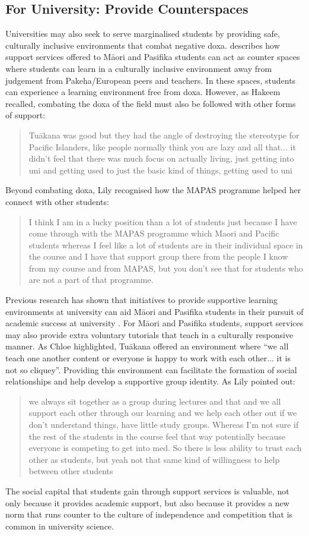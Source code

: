 \subsection{For University: Provide Counterspaces}
Universities may also seek to serve marginalised students by providing safe, culturally inclusive environments that combat negative doxa. \cite{mayeda2014you} describes how support services offered to M\={a}ori and Pasifika students can act as counter spaces where students can learn in a culturally inclusive environment away from judgement from Pakeha/European peers and teachers. In these spaces, students can experience a learning environment free from doxa. However, as Hakeem recalled, combating the doxa of the field must also be followed with other forms of support: \blockquote{Tu\={a}kana was good but they had the angle of destroying the stereotype for Pacific Islanders, like people normally think you are lazy and all that... it didn't feel that there was much focus on actually living, just getting into uni and getting used to just the basic kind of things, getting used to uni} Beyond combating doxa, Lily recognised how the MAPAS programme helped her connect with other students: \blockquote{I think I am in a lucky position than a lot of students just because I have come through with the MAPAS programme which Maori and Pacific students whereas I feel like a lot of students are in their individual space in the course and I have that support group there from the people I know from my course and from MAPAS, but you don’t see that for students who are not a part of that programme.} Previous research has shown that initiatives to provide supportive learning environments at university can aid M\={a}ori and Pasifika students in their pursuit of academic success at university \cite{wilson2011awhina}. For M\={a}ori and Pasifika students, support services may also provide extra voluntary tutorials that teach in a culturally responsive manner. As Chloe highlighted, Tu\={a}kana offered an environment where ``we all teach one another content or everyone is happy to work with each other...  it is not so cliquey''. Providing this environment can facilitate the formation of social relationships and help develop a supportive group identity. As Lily pointed out: \blockquote{we always sit together as a group during lectures and that and we all support each other through our learning and we help each other out if we don’t understand things, have little study groups. Whereas I’m not sure if the rest of the students in the course feel that way potentially because everyone is competing to get into med. So there is less ability to trust each other as students, but yeah not that same kind of willingness to help between other students}. The social capital that students gain through support services is valuable, not only because it provides academic support, but also because it provides a new norm that runs counter to the culture of independence and competition that is common in university science.



